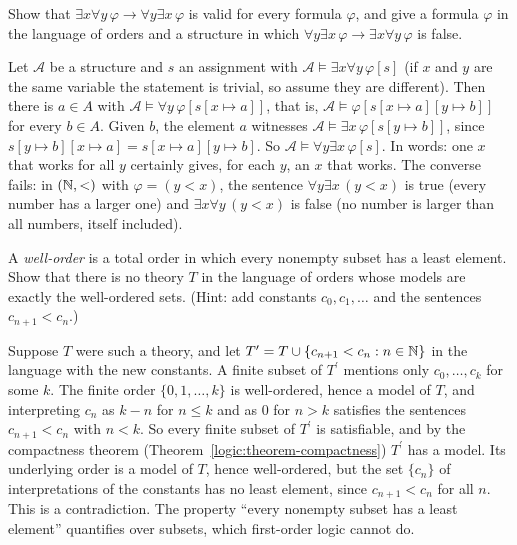 \begin{exercise}\label{logic:exercise-quantifier-order}
Show that $\exists x \forall y\, \varphi \to \forall y \exists x\, \varphi$ is
valid for every formula $\varphi$, and give a formula $\varphi$ in the language
of orders and a structure in which
$\forall y \exists x\, \varphi \to \exists x \forall y\, \varphi$ is false.
\end{exercise}

\begin{solution}
Let $\mathcal{A}$ be a structure and $s$ an assignment with $\mathcal{A} \models \exists x \forall y\, \varphi[s]$ (if $x$ and $y$ are the same variable the statement is trivial, so assume
they are different). Then there is $a \in A$ with $\mathcal{A} \models \forall y\, \varphi[s[x \mapsto a]]$, that is, $\mathcal{A} \models \varphi[s[x \mapsto a][y \mapsto b]]$ for every $b \in A$.
Given $b$, the element $a$ witnesses $\mathcal{A} \models \exists x\, \varphi[s[y \mapsto b]]$, since $s[y \mapsto b][x \mapsto a] = s[x \mapsto a][y \mapsto b]$. So
$\mathcal{A} \models \forall y \exists x\, \varphi[s]$. In words: one $x$ that works for all $y$ certainly gives, for each $y$, an $x$ that works. The converse fails: in $(\mathbb{N}, <)$
with $\varphi = (y < x)$, the sentence $\forall y \exists x\,(y < x)$ is true (every number has a larger one) and $\exists x \forall y\,(y < x)$ is false (no number is larger than
all numbers, itself included).
\end{solution}

\begin{exercise}\label{logic:exercise-well-orders}
A \emph{well-order} is a total order in which every nonempty subset has a
least element. Show that there is no theory $T$ in the language of orders
whose models are exactly the well-ordered sets. (Hint: add constants
$c_0, c_1, \ldots$ and the sentences $c_{n+1} < c_n$.)
\end{exercise}

\begin{solution}
Suppose $T$ were such a theory, and let $T^{\prime} = T \cup \{c_{n+1} < c_n : n \in \mathbb{N}\}$ in the language with the new constants. A finite subset of $T^{\prime}$ mentions only
$c_0, \ldots, c_k$ for some $k$. The finite order $\{0, 1, \ldots, k\}$ is well-ordered, hence a model of $T$, and interpreting $c_n$ as $k - n$ for $n \leq k$ and as $0$ for $n > k$
satisfies the sentences $c_{n+1} < c_n$ with $n < k$. So every finite subset of $T^{\prime}$ is satisfiable, and by the compactness theorem (Theorem~\ref{logic:theorem-compactness}) $T^{\prime}$
has a model. Its underlying order is a model of $T$, hence well-ordered, but the set $\{c_n\}$ of interpretations of the constants has no least element, since $c_{n+1} < c_n$ for
all $n$. This is a contradiction. The property ``every nonempty subset has a least element'' quantifies over subsets, which first-order logic cannot do.
\end{solution}

